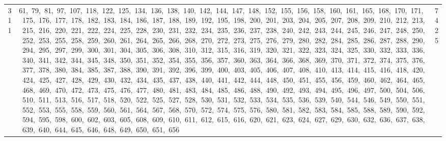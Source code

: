 \begin{longtable}{c|p{}|r}
311 & 61,\ 79,\ 81,\ 97,\ 107,\ 118,\ 122,\ 125,\ 134,\ 136,\ 138,\ 140,\ 142,\ 144,\ 147,\ 148,\ 152,\ 155,\ 156,\ 158,\ 160,\ 161,\ 165,\ 168,\ 170,\ 171,\ 175,\ 176,\ 177,\ 178,\ 182,\ 183,\ 184,\ 186,\ 187,\ 188,\ 189,\ 192,\ 195,\ 198,\ 200,\ 201,\ 203,\ 204,\ 205,\ 207,\ 208,\ 209,\ 210,\ 212,\ 213,\ 215,\ 216,\ 220,\ 221,\ 222,\ 224,\ 225,\ 228,\ 230,\ 231,\ 232,\ 234,\ 235,\ 236,\ 237,\ 238,\ 240,\ 242,\ 243,\ 244,\ 245,\ 246,\ 247,\ 248,\ 250,\ 252,\ 253,\ 255,\ 258,\ 259,\ 260,\ 261,\ 264,\ 265,\ 266,\ 268,\ 270,\ 272,\ 273,\ 275,\ 276,\ 279,\ 280,\ 282,\ 284,\ 285,\ 286,\ 287,\ 288,\ 290,\ 294,\ 295,\ 297,\ 299,\ 300,\ 301,\ 304,\ 305,\ 306,\ 308,\ 310,\ 312,\ 315,\ 316,\ 319,\ 320,\ 321,\ 322,\ 323,\ 324,\ 325,\ 330,\ 332,\ 333,\ 336,\ 340,\ 341,\ 342,\ 344,\ 345,\ 348,\ 350,\ 351,\ 352,\ 354,\ 355,\ 356,\ 357,\ 360,\ 363,\ 364,\ 366,\ 368,\ 369,\ 370,\ 371,\ 372,\ 374,\ 375,\ 376,\ 377,\ 378,\ 380,\ 384,\ 385,\ 387,\ 388,\ 390,\ 391,\ 392,\ 396,\ 399,\ 400,\ 403,\ 405,\ 406,\ 407,\ 408,\ 410,\ 413,\ 414,\ 415,\ 416,\ 418,\ 420,\ 424,\ 425,\ 427,\ 428,\ 429,\ 430,\ 432,\ 434,\ 435,\ 437,\ 438,\ 440,\ 441,\ 442,\ 444,\ 448,\ 450,\ 451,\ 455,\ 456,\ 459,\ 460,\ 462,\ 464,\ 465,\ 468,\ 469,\ 470,\ 472,\ 473,\ 475,\ 476,\ 477,\ 480,\ 481,\ 483,\ 484,\ 485,\ 486,\ 488,\ 490,\ 492,\ 493,\ 494,\ 495,\ 496,\ 497,\ 500,\ 504,\ 506,\ 510,\ 511,\ 513,\ 516,\ 517,\ 518,\ 520,\ 522,\ 525,\ 527,\ 528,\ 530,\ 531,\ 532,\ 533,\ 534,\ 535,\ 536,\ 539,\ 540,\ 544,\ 546,\ 549,\ 550,\ 551,\ 552,\ 553,\ 555,\ 558,\ 559,\ 560,\ 561,\ 564,\ 567,\ 568,\ 570,\ 572,\ 574,\ 575,\ 576,\ 580,\ 581,\ 582,\ 583,\ 584,\ 585,\ 588,\ 589,\ 590,\ 592,\ 594,\ 595,\ 598,\ 600,\ 602,\ 603,\ 605,\ 608,\ 609,\ 610,\ 611,\ 612,\ 615,\ 616,\ 620,\ 621,\ 623,\ 624,\ 627,\ 629,\ 630,\ 632,\ 636,\ 637,\ 638,\ 639,\ 640,\ 644,\ 645,\ 646,\ 648,\ 649,\ 650,\ 651,\ 656 & 7425 \\

\end{longtable}
